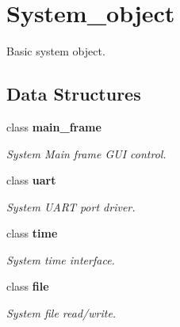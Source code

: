 \section{System\+\_\+object}
\label{group___system__object}


Basic system object.  


\subsection*{Data Structures}
\begin{DoxyCompactItemize}
\item 
class \textbf{ main\+\_\+frame}
\begin{DoxyCompactList}\small\item\em System Main frame G\+UI control. \end{DoxyCompactList}\item 
class \textbf{ uart}
\begin{DoxyCompactList}\small\item\em System U\+A\+RT port driver. \end{DoxyCompactList}\item 
class \textbf{ time}
\begin{DoxyCompactList}\small\item\em System time interface. \end{DoxyCompactList}\item 
class \textbf{ file}
\begin{DoxyCompactList}\small\item\em System file read/write. \end{DoxyCompactList}\end{DoxyCompactItemize}
